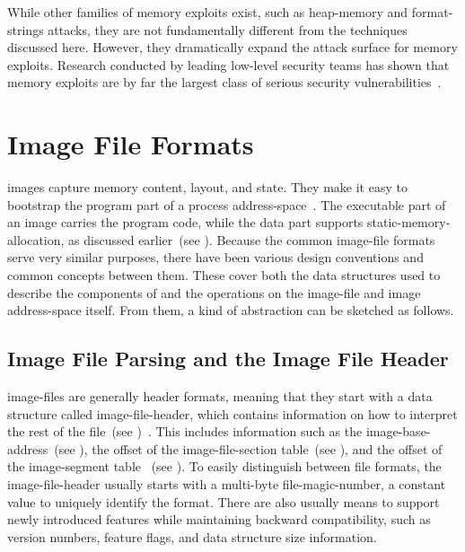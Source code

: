 While other families of memory exploits exist, such as \gls{heap-memory} and \glspl{format-string} attacks, they are not fundamentally different from the techniques discussed here. However, they dramatically expand the attack surface for memory exploits. Research conducted by leading low-level security teams has shown that memory exploits are by far the largest class of serious security vulnerabilities~\cite{10.1007/978-3-642-33338-5_5,mem-tag,gpz-zero-days,apple-mem-alloc}.

\section{Image File Formats}

\Glspl{image} capture memory content, layout, and state. They make it easy to bootstrap the program part of a process \gls{address-space}~\cite{levine2000linkers}. The executable part of an \gls{image} carries the program code, while the data part supports \gls{static-memory-allocation}, as discussed earlier~(see ). Because the common \gls{image-file} formats serve very similar purposes, there have been various design conventions and common concepts between them. These cover both the data structures used to describe the components of and the operations on the \gls{image-file} and \gls{image} \gls{address-space} itself. From them, a kind of abstraction can be sketched as follows.

\subsection{Image File Parsing and the Image File Header}

\Glspl{image-file} are generally header formats, meaning that they start with a data structure called \gls{image-file-header}, which contains information on how to interpret the rest of the file~(see )~\cite{levine2000linkers}. This includes information such as the \gls{image-base-address}~(see ), the offset of the \gls{image-file-section} table~(see ), and the offset of the \gls{image-segment} table ~(see ). To easily distinguish between file formats, the \gls{image-file-header} usually starts with a multi-\gls{byte} \gls{file-magic-number}, a constant value to uniquely identify the format. There are also usually means to support newly introduced features while maintaining backward compatibility, such as version numbers, feature flags, and data structure size information.


